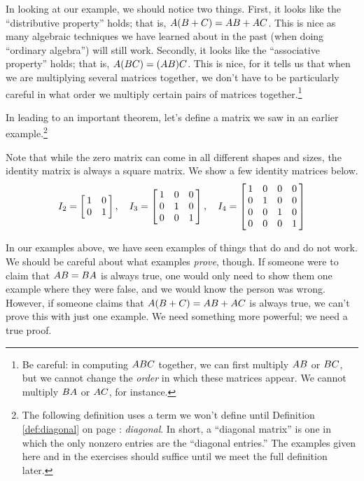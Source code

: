 In looking at our example, we should notice two things. First, it looks like the ``distributive property'' holds; that is, $A(B+C) = AB + AC$. This is nice as many algebraic techniques we have learned about in the past (when doing ``ordinary algebra'') will still work. Secondly, it looks like the ``associative property'' holds; that is, $A(BC) = (AB)C$. This is nice, for it tells us that when we are multiplying several matrices together, we don't have to be particularly careful in what order we multiply certain pairs of matrices together.\footnote{Be careful: in computing $ABC$ together, we can first multiply $AB$ or $BC$, but we cannot change the \textit{order} in which these matrices appear. We cannot multiply $BA$ or $AC$, for instance.}							


In leading to an important theorem, let's define a matrix we saw in an earlier example.\footnote{The following definition uses a term we won't define until Definition \ref{def:diagonal} on page \pageref{def:diagonal}: \textit{diagonal}. In short, a ``diagonal matrix'' is one in which the only nonzero entries are the ``diagonal entries.'' The examples given here and in the exercises should suffice until we meet the full definition later.}


Note that while the zero matrix can come in all different shapes and sizes, the identity matrix is always a square matrix. We show a few identity matrices below. $$I_2= \left[\hskip -3pt\begin{array}{cc}1&0\\0&1\end{array}\hskip -3pt\right] ,\quad I_3 = \left[\hskip -3pt\begin{array}{ccc}1&0&0\\0&1&0\\0&0&1\end{array}\hskip -3pt\right] , \quad I_4 = \left[\hskip -3pt\begin{array}{cccc}1&0&0&0\\0&1&0&0\\0&0&1&0\\0&0&0&1\end{array}\hskip -3pt\right] $$

In our examples above, we have seen examples of things that do and do not work. We should be careful about what examples \textit{prove}, though. If someone were to claim that $AB = BA$ is always true, one would only need to show them one example where they were false, and we would know the person was wrong. However, if someone claims that $A(B+C) = AB+AC$ is always true, we can't prove this with just one example. We need something more powerful; we need a true proof. 

